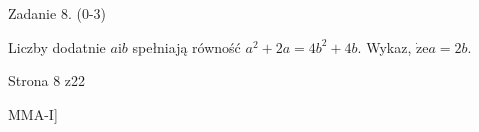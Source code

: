 \documentclass[a4paper,12pt]{article}
\begin{document}
Zadanie 8. (0-3)

Liczby dodatnie $a\mathrm{i}b$ spełniają równość $a^{2}+2a=4b^{2}+4b$. Wykaz, $\dot{\mathrm{z}}\mathrm{e}a=2b.$

Strona 8 z22

MMA-I]
\end{document}
